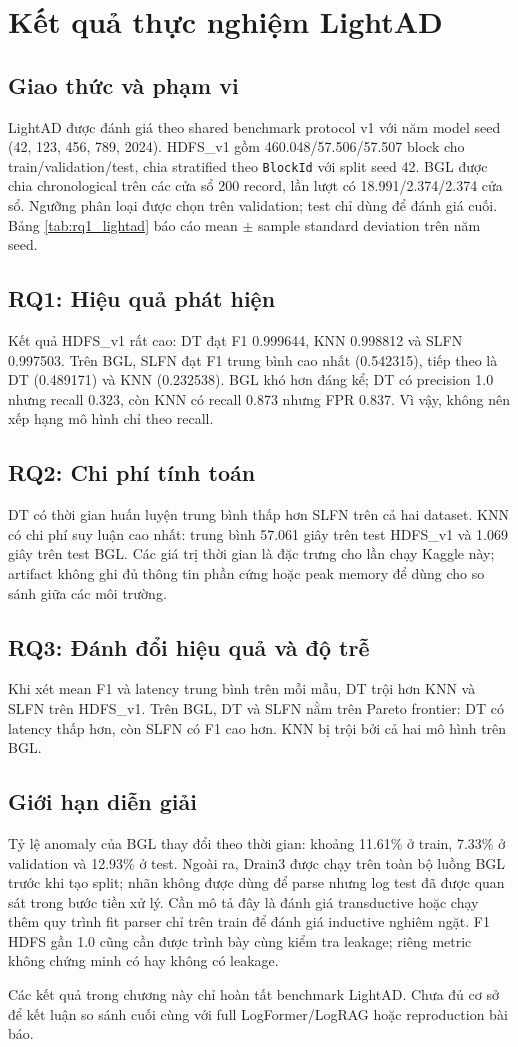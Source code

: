 \chapter{Kết quả thực nghiệm LightAD}

\section{Giao thức và phạm vi}
LightAD được đánh giá theo shared benchmark protocol v1 với năm model seed
(42, 123, 456, 789, 2024). HDFS\_v1 gồm 460.048/57.506/57.507 block cho
train/validation/test, chia stratified theo \texttt{BlockId} với split seed
42. BGL được chia chronological trên các cửa sổ 200 record, lần lượt có
18.991/2.374/2.374 cửa sổ. Ngưỡng phân loại được chọn trên validation; test
chỉ dùng để đánh giá cuối. Bảng \ref{tab:rq1_lightad} báo cáo mean $\pm$ sample
standard deviation trên năm seed.

\section{RQ1: Hiệu quả phát hiện}
Kết quả HDFS\_v1 rất cao: DT đạt F1 0.999644, KNN 0.998812 và SLFN 0.997503.
Trên BGL, SLFN đạt F1 trung bình cao nhất (0.542315), tiếp theo là DT
(0.489171) và KNN (0.232538). BGL khó hơn đáng kể; DT có precision 1.0 nhưng
recall 0.323, còn KNN có recall 0.873 nhưng FPR 0.837. Vì vậy, không nên xếp
hạng mô hình chỉ theo recall.

\section{RQ2: Chi phí tính toán}
DT có thời gian huấn luyện trung bình thấp hơn SLFN trên cả hai dataset. KNN
có chi phí suy luận cao nhất: trung bình 57.061 giây trên test HDFS\_v1 và
1.069 giây trên test BGL. Các giá trị thời gian là đặc trưng cho lần chạy
Kaggle này; artifact không ghi đủ thông tin phần cứng hoặc peak memory để dùng
cho so sánh giữa các môi trường.

\section{RQ3: Đánh đổi hiệu quả và độ trễ}
Khi xét mean F1 và latency trung bình trên mỗi mẫu, DT trội hơn KNN và SLFN
trên HDFS\_v1. Trên BGL, DT và SLFN nằm trên Pareto frontier: DT có latency
thấp hơn, còn SLFN có F1 cao hơn. KNN bị trội bởi cả hai mô hình trên BGL.

\section{Giới hạn diễn giải}
Tỷ lệ anomaly của BGL thay đổi theo thời gian: khoảng 11.61\% ở train, 7.33\%
ở validation và 12.93\% ở test. Ngoài ra, Drain3 được chạy trên toàn bộ luồng
BGL trước khi tạo split; nhãn không được dùng để parse nhưng log test đã được
quan sát trong bước tiền xử lý. Cần mô tả đây là đánh giá transductive hoặc
chạy thêm quy trình fit parser chỉ trên train để đánh giá inductive nghiêm
ngặt. F1 HDFS gần 1.0 cũng cần được trình bày cùng kiểm tra leakage; riêng
metric không chứng minh có hay không có leakage.

Các kết quả trong chương này chỉ hoàn tất benchmark LightAD. Chưa đủ cơ sở để
kết luận so sánh cuối cùng với full LogFormer/LogRAG hoặc reproduction bài báo.


